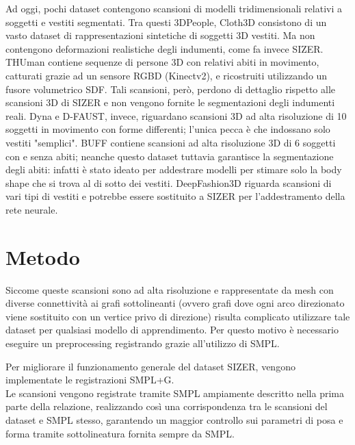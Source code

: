 Ad oggi, pochi dataset contengono scansioni di modelli tridimensionali relativi a soggetti e vestiti segmentati. Tra questi 3DPeople, Cloth3D consistono di un vasto dataset di rappresentazioni sintetiche di soggetti 3D vestiti. Ma non contengono deformazioni realistiche degli indumenti, come fa invece SIZER. THUman contiene sequenze di persone 3D con relativi abiti in movimento, catturati grazie ad un sensore RGBD (Kinectv2), e ricostruiti utilizzando un fusore volumetrico SDF. Tali scansioni, però, perdono di dettaglio rispetto alle scansioni 3D di SIZER e non vengono fornite le segmentazioni degli indumenti reali. Dyna e D-FAUST, invece, riguardano scansioni 3D ad alta risoluzione di  10 soggetti in movimento con forme differenti; l'unica pecca è che indossano solo vestiti "semplici". BUFF contiene scansioni ad alta risoluzione 3D di 6 soggetti con e senza abiti; neanche questo dataset tuttavia garantisce la segmentazione degli abiti: infatti è stato ideato per addestrare modelli per stimare solo la body shape che si trova al di sotto dei vestiti. 
DeepFashion3D riguarda scansioni di vari tipi di vestiti e potrebbe essere sostituito a SIZER per l'addestramento della rete neurale.








\newpage



\section{Metodo}




\medskip

Siccome queste scansioni sono ad alta risoluzione e rappresentate da mesh con diverse connettività ai grafi sottolineanti (ovvero grafi dove ogni arco direzionato viene sostituito con un vertice privo di direzione) risulta complicato utilizzare tale dataset per qualsiasi modello di apprendimento. Per questo motivo è necessario eseguire un preprocessing registrando grazie all'utilizzo di SMPL.

\medskip

Per migliorare il funzionamento generale del dataset SIZER, vengono implementate le registrazioni SMPL+G.\\
Le scansioni vengono registrate tramite SMPL ampiamente descritto nella prima parte della relazione, realizzando così una corrispondenza tra le scansioni del dataset e SMPL stesso, garantendo un maggior controllo sui parametri di posa e forma tramite sottolineatura fornita sempre da SMPL.


